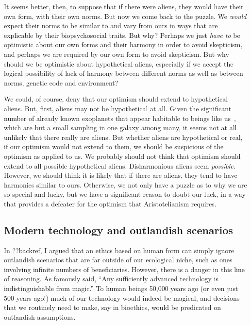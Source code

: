It seems better, then, to suppose that if there were aliens, they would have their own form, with their own norms.
But now we come back to the puzzle. We \textit{would} expect their norms to be similar to and vary from ours in ways
that are explicable by their biopsychosocial traits. But why? Perhaps we just \textit{have to} be optimistic about 
our own forms and their harmony in order to avoid skepticism, and perhaps we are required by our own form to avoid 
skepticism. But why should we be optimistic about hypothetical aliens, especially if we accept the logical possibility
of lack of harmony between different norms as well as between norms, genetic code and environment? 

We could, of course, deny that our optimism should extend to hypothetical aliens. But, first, aliens may not be
hypothetical at all. Given the significant number of already known exoplanets that appear habitable to beings like 
us~\parencite{BLK2026}, which are but a small sampling in one galaxy among many, it seems not at all unlikely that there really
are aliens. But whether aliens are hypothetical or real, if our optimism would not extend to them, we should be
suspicious of the optimism as applied to us. We probably should not think that optimism should extend to all possible hypothetical aliens. Disharmonious
aliens seem \textit{possible}. However, we should think it is likely that if there are aliens, they tend to have 
harmonies similar to ours. Otherwise, we not only have a puzzle as to why we are so special and lucky, but we have
a significant reason to doubt our luck, in a way that provides a defeater for the optimism that Aristotelianism
requires.


\subsection{Modern technology and outlandish scenarios}\label{sec:outlandish}
In ??backref, I argued that an ethics based on human form can simply ignore outlandish scenarios
that are far outside of our ecological niche, such as ones involving infinite numbers of
beneficiaries. However, there is a danger in this line of reasoning. As  famously
said, ``Any sufficiently advanced technology is indistinguishable from magic.'' To human beings
50,000 years ago (or even just 500 years ago!) much of our technology would indeed be magical, and 
decisions that we routinely need to make, say in bioethics, would be predicated on outlandish assumptions. 

